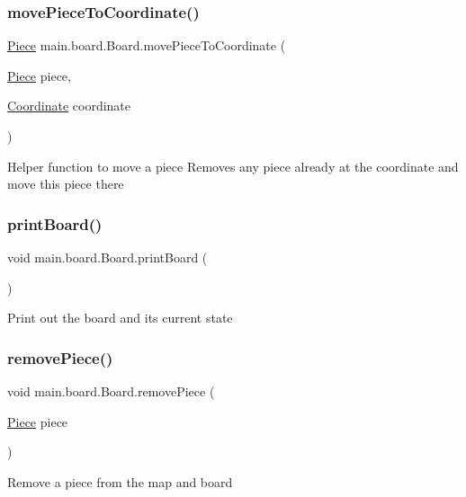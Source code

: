 \subsubsection{\texorpdfstring{move\+Piece\+To\+Coordinate()}{movePieceToCoordinate()}}
{\footnotesize\ttfamily \hyperlink{classmain_1_1pieces_1_1_piece}{Piece} main.\+board.\+Board.\+move\+Piece\+To\+Coordinate (\begin{DoxyParamCaption}\item[{\hyperlink{classmain_1_1pieces_1_1_piece}{Piece}}]{piece,  }\item[{\hyperlink{classmain_1_1board_1_1_coordinate}{Coordinate}}]{coordinate }\end{DoxyParamCaption})}

Helper function to move a piece Removes any piece already at the coordinate and move this piece there \hypertarget{classmain_1_1board_1_1_board_a2677c5c4cac9640e81c005d4edf20047}{}\label{classmain_1_1board_1_1_board_a2677c5c4cac9640e81c005d4edf20047} 
\subsubsection{\texorpdfstring{print\+Board()}{printBoard()}}
{\footnotesize\ttfamily void main.\+board.\+Board.\+print\+Board (\begin{DoxyParamCaption}{ }\end{DoxyParamCaption})}

Print out the board and its current state \hypertarget{classmain_1_1board_1_1_board_a2d7676d389be445b683cd490fe99f1d0}{}\label{classmain_1_1board_1_1_board_a2d7676d389be445b683cd490fe99f1d0} 
\subsubsection{\texorpdfstring{remove\+Piece()}{removePiece()}}
{\footnotesize\ttfamily void main.\+board.\+Board.\+remove\+Piece (\begin{DoxyParamCaption}\item[{\hyperlink{classmain_1_1pieces_1_1_piece}{Piece}}]{piece }\end{DoxyParamCaption})}

Remove a piece from the map and board \hypertarget{classmain_1_1board_1_1_board_ad75bd012fbde4f7baffd1a417c00a7d4}{}\label{classmain_1_1board_1_1_board_ad75bd012fbde4f7baffd1a417c00a7d4} 
